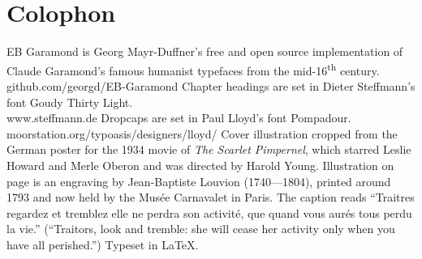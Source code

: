 \documentclass[paper=a5,BCOR=7mm,twoside,DIV=calc,12pt,usegeometry,chapterprefix,endperiod,headings=big]{scrbook}
\begin{document}
\chapter*{Colophon}

\centering
EB Garamond is Georg Mayr-Duffner's free and open source implementation of Claude Garamond's famous humanist typefaces from the mid-16\textsuperscript{th} century. \\github.com/georgd/EB-Garamond
\vfill
Chapter headings are set in Dieter Steffmann's font Goudy Thirty Light.\\www.steffmann.de
\vfill
Dropcaps are set in Paul Lloyd's font Pompadour.\\moorstation.org/typoasis/designers/lloyd/
\vfill
Cover illustration cropped from the German poster for the 1934 movie of \textit{The Scarlet Pimpernel}, which starred Leslie Howard and Merle Oberon and was directed by Harold Young.
\vfill
Illustration on page \pageref{guillotine} is an engraving by Jean-Baptiste Louvion (1740---1804), printed around 1793 and now held by the Musée Carnavalet in Paris. The caption reads \enquote{Traitres regardez et tremblez elle ne perdra son activité, que quand vous aurés tous perdu la vie.} (\enquote{Traitors, look and tremble: she will cease her activity only when you have all perished.})
\vfill
Typeset in \LaTeX{}.
\thispagestyle{empty}
\end{document}
